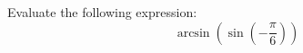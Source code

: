 \documentclass{ximera}
\author{David Kish}
\begin{document}
\begin{exercise}
Evaluate the following expression:
\[
\arcsin(\sin(-\frac{\pi}{6}))
\]
\begin{multipleChoice}
\end{multipleChoice}
\end{exercise}
\end{document}
